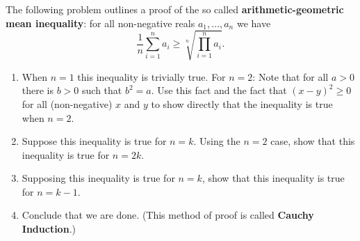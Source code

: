 The following problem outlines a proof of the so called \textbf{arithmetic-geometric mean inequality}: for all non-negative reals $a_1, \dots, a_n$ we have
\[\frac{1}{n}\sum_{i = 1}^n a_i \geq \sqrt[n]{\prod_{i = 1}^na_i}.\]
\begin{enumerate}
    \item When $n = 1$ this inequality is trivially true. For $n = 2$: Note that for all $a > 0$ there is $b > 0$ such that $b^2=a$. Use this fact and the fact that $(x - y)^2 \geq 0$ for all (non-negative) $x$ and $y$ to show directly that the inequality is true when $n = 2$.
    \item Suppose this inequality is true for $n = k$. Using the $n = 2$ case, show that this inequality is true for $n = 2k$. 
    \item Supposing this inequality is true for $n = k$, show that this inequality is true for $n = k-1$.
    \item Conclude that we are done. (This method of proof is called \textbf{Cauchy Induction}.)
\end{enumerate}